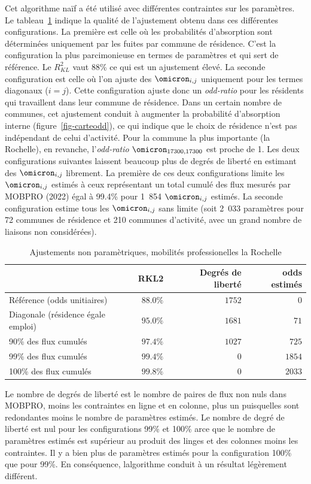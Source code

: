 \documentclass[
  10pt,
  a4paper,
  numbers=noendperiod,
  DIV=9]{scrreprt}
\begin{document}
Cet algorithme naïf a été utilisé avec différentes contraintes sur les
paramètres. Le tableau~\ref{tbl-meapsR2-np} indique la qualité de
l'ajustement obtenu dans ces différentes configurations. La première est
celle où les probabilités d'absorption sont déterminées uniquement par
les fuites par commune de résidence. C'est la configuration la plus
parcimonieuse en termes de paramètres et qui sert de référence. Le
\(R^2_{KL}\) vaut 88\% ce qui est un ajustement élevé. La seconde
configuration est celle où l'on ajuste des \(\omicron_{i,j}\) uniquement
pour les termes diagonaux (\(i=j\)). Cette configuration ajuste donc un
\emph{odd-ratio} pour les résidents qui travaillent dans leur commune de
résidence. Dans un certain nombre de communes, cet ajustement conduit à
augmenter la probabilité d'absorption interne
(figure~\ref{fig-carteodd}), ce qui indique que le choix de résidence
n'est pas indépendant de celui d'activité. Pour la commune la plus
importante (la Rochelle), en revanche, l'\emph{odd-ratio}
\(\omicron_{17300, 17300}\) est proche de 1. Les deux configurations
suivantes laissent beaucoup plus de degrés de liberté en estimant des
\(\omicron_{i,j}\) librement. La première de ces deux configurations
limite les \(\omicron_{i,j}\) estimés à ceux représentant un total
cumulé des flux mesurés par MOBPRO (2022) égal à 99.4\% pour 1~854
\(\omicron_{i,j}\) estimés. La seconde configuration estime tous les
\(\omicron_{i,j}\) sans limite (soit 2~033 paramètres pour 72 communes
de résidence et 210 communes d'activité, avec un grand nombre de
liaisons non considérées).

\hypertarget{tbl-meapsR2-np}{}
\setlength{\LTpost}{0mm}
\begin{longtable}{lrrr}
\caption{\label{tbl-meapsR2-np}Ajustements non paramètriques, mobilités professionelles la Rochelle }\tabularnewline

\toprule
 & RKL2 & Degrés de liberté & odds estimés \\ 
\midrule
Référence (odds unitiaires) & $88.0\%$ & $1 752$ & $0$ \\ 
Diagonale (résidence égale emploi) & $95.0\%$ & $1 681$ & $71$ \\ 
90\% des flux cumulés & $97.4\%$ & $1 027$ & $725$ \\ 
99\% des flux cumulés  & $99.4\%$ & $0$ & $1 854$ \\ 
100\% des flux cumulés & $99.8\%$ & $0$ & $2 033$ \\ 
\bottomrule
\end{longtable}
\begin{minipage}{\linewidth}
Le nombre de degrés de liberté est le nombre de paires de flux non nuls dans MOBPRO, moins les contraintes en ligne et en colonne, plus un puisqu\textquotesingle{}elles sont redondantes moins le nombre de paramètres estimés. Le nombre de degré de liberté est nul pour les configurations 99\% et 100\% arce que le nombre de paramètres estimés est supérieur au produit des linges et des colonnes moins les contraintes. Il y a bien plus de paramètres estimés pour la configuration 100\%  que pour 99\%. En conséquence, l\textquotesingle{}algorithme conduit à un résultat légèrement différent.\\
\end{minipage}
\end{document}
